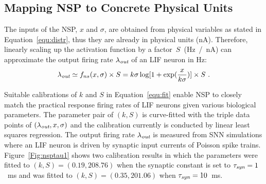 	
	\subsection{Mapping NSP to Concrete Physical Units}
	\label{sec:af_model}
	The inputs of the NSP, $x$ and $\sigma$, are obtained from physical variables as stated in Equation~\ref{equ:distr}, thus they are already in physical units (nA).
	Therefore, linearly scaling up the activation function by a factor~$S$~(Hz~/~nA) can approximate the output firing rate $\lambda_{\textit{\textrm{out}}}$ of an LIF neuron in Hz:
	\begin{equation}
	\lambda_{\textit{\textrm{out}}} \simeq f_{ns}(x, \sigma) \times S = k \sigma \log [1 + \exp(\frac{x}{k \sigma})] \times S~.
	\label{equ:fit}
	\end{equation}	
	
	
	Suitable calibrations of $k$ and $S$ in Equation~\ref{equ:fit} enable NSP to closely match the practical response firing rates of LIF neurons given various biological parameters.
	The parameter pair of $(k, S)$ is curve-fitted with the triple data points of $(\lambda_{\textit{\textrm{out}}}, x, \sigma)$ and the calibration currently is conducted by linear least squares regression.
	The output firing rate $\lambda_{\textit{\textrm{out}}}$ is measured from SNN simulations where an LIF neuron is driven by synaptic input currents of Poisson spike trains.
	Figure~\ref{Fig:nsptau1} shows two calibration results in which the parameters were fitted to $(k, S)=(0.19,208.76)$ when the synaptic constant is set to $\tau_{\textit{\textrm{syn}}}=1$~ms and was fitted to $(k, S)=(0.35,201.06)$ when $\tau_{\textit{\textrm{syn}}}=10$~ms.
	
